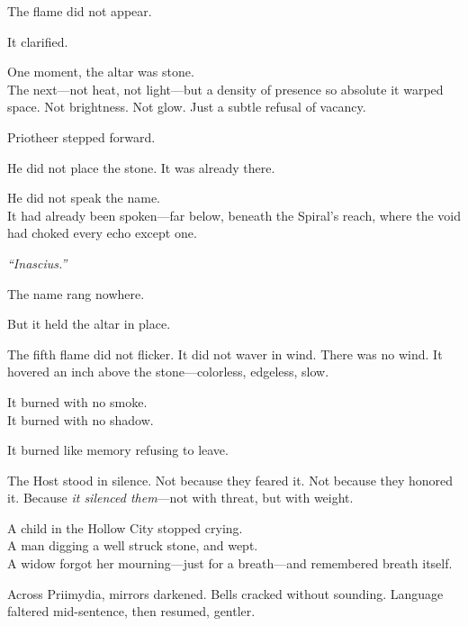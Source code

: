 \documentclass[9pt]{article}
\begin{document}
The flame did not appear.

\vspace{0.5em}
It clarified.

\vspace{0.5em}
One moment, the altar was stone.\\
The next---not heat, not light---but a density of presence so absolute it warped space. Not brightness. Not glow. Just a subtle refusal of vacancy.

\vspace{0.5em}
Priotheer stepped forward.

\vspace{0.5em}
He did not place the stone. It was already there.

\vspace{0.5em}
He did not speak the name.\\
It had already been spoken---far below, beneath the Spiral’s reach, where the void had choked every echo except one.

\vspace{0.5em}
\textit{``Inascius.''}

\vspace{0.5em}
The name rang nowhere.

\vspace{0.5em}
But it held the altar in place.

\vspace{0.5em}
The fifth flame did not flicker. It did not waver in wind. There was no wind. It hovered an inch above the stone---colorless, edgeless, slow.

\vspace{0.5em}
It burned with no smoke.\\
It burned with no shadow.

\vspace{0.5em}
It burned like memory refusing to leave.

\vspace{0.5em}
The Host stood in silence. Not because they feared it. Not because they honored it. Because \textit{it silenced them}---not with threat, but with weight.

\vspace{0.5em}
A child in the Hollow City stopped crying.\\
A man digging a well struck stone, and wept.\\
A widow forgot her mourning---just for a breath---and remembered breath itself.

\vspace{0.5em}
Across Priimydia, mirrors darkened. Bells cracked without sounding. Language faltered mid-sentence, then resumed, gentler.
\end{document}
